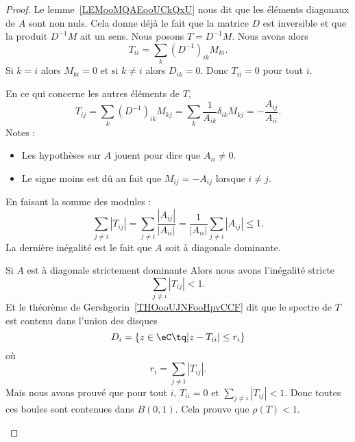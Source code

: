 \begin{proof}
	Le lemme~\ref{LEMooMQAEooUCkQxU} nous dit que les éléments diagonaux de \( A\) sont non nuls. Cela donne déjà le fait que la matrice \( D\) est inversible et que la produit \( D^{-1}M\) ait un sens. Nous posons \( T=D^{-1}M\). Nous avons alors
	\begin{equation}
		T_{ii}=\sum_k(D^{-1})_{ik}M_{ki}.
	\end{equation}
	Si \( k=i\) alors \( M_{ki}=0\) et si \( k\neq i\) alors \( D_{ik}=0\). Donc \( T_{ii}=0\) pour tout \( i\).

	En ce qui concerne les autres éléments de \( T\),
	\begin{equation}
		T_{ij}=\sum_k(D^{-1})_{ik}M_{kj}=\sum_k\frac{1}{ A_{ik} }\delta_{ik}M_{kj}=-\frac{ A_{ij} }{ A_{ii} }.
	\end{equation}
	Notes :
	\begin{itemize}
		\item
		      Les hypothèses sur \( A\) jouent pour dire que \( A_{ii}\neq 0\).
		\item
		      Le signe moins est dû au fait que \( M_{ij}=-A_{ij}\) lorsque \( i\neq j\).
	\end{itemize}
	En faisant la somme des modules :
	\begin{equation}
		\sum_{j\neq i}| T_{ij} |=\sum_{j\neq i}\frac{ | A_{ij} | }{ | A_{ii} | }=\frac{1}{ | A_{ii} | }\sum_{j\neq i}| A_{ij} |\leq 1.
	\end{equation}
	La dernière inégalité est le fait que \( A\) soit à diagonale dominante.

	\begin{subproof}
		\item[Si \( A\) est à diagonale strictement dominante]
		Alors nous avons l'inégalité stricte
		\begin{equation}
			\sum_{j\neq i}| T_{ij} |<1.
		\end{equation}
		Et le théorème de Gershgorin~\ref{THOooUJNFooHpvCCF} dit que le spectre de \( T\) est contenu dans l'union des disques
		\begin{equation}
			D_i=\{ z\in \eC\tq | z-T_{ii} |\leq r_i \}
		\end{equation}
		où
		\begin{equation}
			r_i=\sum_{j\neq i}| T_{ij} |.
		\end{equation}
		Mais nous avons prouvé que pour tout \( i\), \( T_{ii}=0\) et \( \sum_{j\neq i}| T_{ij} |<1\). Donc toutes ces boules sont contenues dans \( B(0,1)\). Cela prouve que \( \rho(T)<1\).


\end{subproof}
\end{proof}
